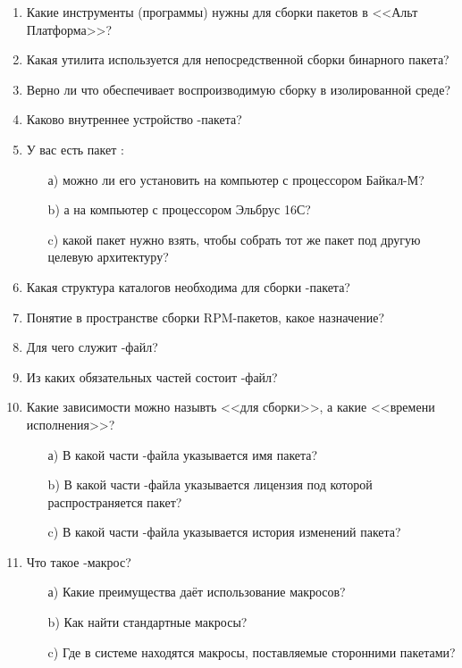 \begin{enumerate}
\item Какие инструменты (программы) нужны для сборки пакетов в <<Альт Платформа>>?
\item Какая утилита используется для непосредственной сборки бинарного пакета?
\item Верно ли что  обеспечивает воспроизводимую сборку в изолированной среде?
\item Каково внутреннее устройство -пакета?
\item У вас есть пакет :
	\begin{enumerate}
		\item[а)] можно ли его установить на компьютер с процессором Байкал-М?
		\item[b)] а на компьютер с процессором Эльбрус 16С?
		\item[c)] какой пакет нужно взять, чтобы собрать тот же пакет под другую целевую архитектуру?
	\end{enumerate}
\item Какая структура каталогов необходима для сборки -пакета?
\item Понятие  в пространстве сборки RPM-пакетов, какое назначение?
\item Для чего служит -файл?
\item Из каких обязательных частей состоит -файл?
\item Какие зависимости можно назывть <<для сборки>>, а какие <<времени исполнения>>?
	\begin{enumerate}
		\item[а)] В какой части -файла указывается имя пакета?
		\item[b)] В какой части -файла указывается лицензия под которой распространяется пакет?
		\item[c)] В какой части -файла указывается история изменений пакета?
	\end{enumerate}
\item Что такое -макрос?
	\begin{enumerate}
		\item[а)] Какие преимущества даёт использование макросов?
		\item[b)] Как найти стандартные макросы?
		\item[c)] Где в системе находятся макросы, поставляемые сторонними пакетами?
	\end{enumerate}
\end{enumerate}
